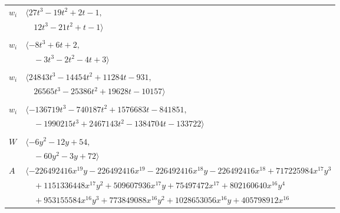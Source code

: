 \documentclass[11pt]{article}
\begin{document}
\begin{longtable}{@{}ll@{}}
$w_i$ & $\langle 27t^{3}-19t^{2}+2t-1,$\\
 & $\quad 12t^{3}-21t^{2}+t-1\rangle$\\
\addlinespace[2pt]
\multicolumn{2}{@{}p{0.97\textwidth}@{}}{$i=42$, $D_i=2$, $\rho_{ij}$: $0{:}1, \allowbreak 22{:}2, \allowbreak 31{:}2, \allowbreak 40{:}2, \allowbreak 45{:}1, \allowbreak 52{:}2$}\\
$w_i$ & $\langle -8t^{3}+6t+2,$\\
 & $\quad -3t^{3}-2t^{2}-4t+3\rangle$\\
\addlinespace[2pt]
\multicolumn{2}{@{}p{0.97\textwidth}@{}}{$i=43$, $D_i=512$, $\rho_{ij}$: $3{:}1, \allowbreak 6{:}1, \allowbreak 9{:}2, \allowbreak 10{:}2, \allowbreak 12{:}1, \allowbreak 25{:}2, \allowbreak 29{:}1, \allowbreak 33{:}2, \allowbreak 40{:}1, \allowbreak 41{:}2, \allowbreak 46{:}1, \allowbreak 51{:}2, \allowbreak 53{:}1, \allowbreak 57{:}1$}\\
$w_i$ & $\langle 24843t^{3}-14454t^{2}+11284t-931,$\\
 & $\quad 26565t^{3}-25386t^{2}+19628t-10157\rangle$\\
\addlinespace[2pt]
\multicolumn{2}{@{}p{0.97\textwidth}@{}}{$i=44$, $D_i=4096$, $\rho_{ij}$: $6{:}2, \allowbreak 8{:}1, \allowbreak 12{:}2, \allowbreak 15{:}1, \allowbreak 18{:}2, \allowbreak 19{:}1, \allowbreak 20{:}1, \allowbreak 23{:}1, \allowbreak 24{:}2, \allowbreak 32{:}2, \allowbreak 33{:}1, \allowbreak 38{:}1, \allowbreak 47{:}1, \allowbreak 59{:}2$}\\
$w_i$ & $\langle -136719t^{3}-740187t^{2}+1576683t-841851,$\\
 & $\quad -1990215t^{3}+2467143t^{2}-1384704t-133722\rangle$\\
\addlinespace[2pt]
\multicolumn{2}{@{}p{0.97\textwidth}@{}}{$i=45$, $D_i=64$, $\rho_{ij}$: $3{:}1, \allowbreak 4{:}2, \allowbreak 5{:}1, \allowbreak 7{:}2, \allowbreak 9{:}2, \allowbreak 22{:}1, \allowbreak 23{:}1, \allowbreak 31{:}2, \allowbreak 33{:}1, \allowbreak 42{:}2, \allowbreak 50{:}1, \allowbreak 51{:}1, \allowbreak 52{:}1, \allowbreak 57{:}2$}\\
$W$ & $\langle -6y^{2}-12y+54,$\\
 & $\quad -60y^{2}-3y+72\rangle$\\
$A$ & $\langle -226492416x^{19}y-226492416x^{19}-226492416x^{18}y-226492416x^{18}+717225984x^{17}y^{3}$\\
 & $\quad +1151336448x^{17}y^{2}+509607936x^{17}y+75497472x^{17}+802160640x^{16}y^{4}$\\
 & $\quad +953155584x^{16}y^{3}+773849088x^{16}y^{2}+1028653056x^{16}y+405798912x^{16}$\\

\end{longtable}
\end{document}
